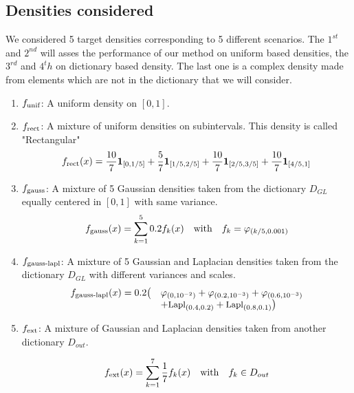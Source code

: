 \subsection{Densities considered}
We considered 5 target densities corresponding to 5 different scenarios. The $1^{st}$ and $2^{nd}$ will asses the performance of our method on uniform based densities, the $3^{rd}$ and $4^th$ on dictionary based density. The last one is a complex density made from elements which are not in the dictionary that we will consider.
\begin{enumerate}
\item{$f_{\textnormal{unif}}$:} A uniform density on $[0,1]$.
\item{$f_{\textnormal{rect}}$:} A mixture of uniform densities on subintervals. This density is called "Rectangular"
\begin{equation}
    f_{\textnormal{rect}}(x)=\frac{10}{7}\b1_{[0,1/5]}+\frac{5}{7}\b1_{[1/5,2/5]}+
    \frac{10}{7}\b1_{[2/5,3/5]}+\frac{10}{7}\b1_{[4/5,1]}
\end{equation}
\item{$f_{\textnormal{gauss}}$:} A mixture of 5 Gaussian densities taken from the dictionary $D_{GL}$ equally centered in $[0,1]$ with same variance.
\begin{equation}
    f_{\textnormal{gauss}}(x)=\sum_{k=1}^5 0.2f_{k}(x) \quad \text{with}\quad f_k=\varphi_{(k/5,0.001)}
\end{equation}

\item{$f_{\textnormal{gauss-lapl}}$:} A mixture of 5 Gaussian and Laplacian densities taken from the dictionary $D_{GL}$ with different variances and scales.
\begin{equation}
\begin{array}{ll}
f_{\textnormal{gauss-lapl}}(x)=0.2\big(&\varphi_{(0 ,10^{-2})} + \varphi_{(0.2,10^{-3})}+\varphi_{(0.6,10^{-3})}\\
    &+\text{\small Lapl}_{(0.4,0.2)}+\text{\small Lapl}_{(0.8,0.1)} \big)
\end{array}
\end{equation}
\item{$f_{\textnormal{ext}}$:} A mixture of Gaussian and Laplacian densities taken from another dictionary $D_{out}$.

\begin{equation}
    f_{\textnormal{ext}}(x)=\sum_{k=1}^7 \frac{1}{7}f_{k}(x) \quad \text{with}\quad f_k\in D_{out}
\end{equation}
\end{enumerate}

